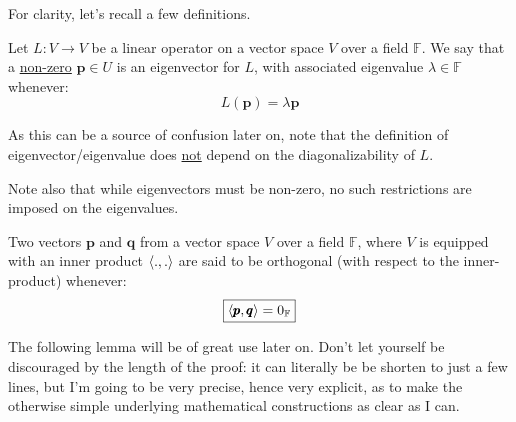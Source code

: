 \documentclass[solutions.tex]{subfiles}
\renewcommand{\bm}[1]{\pmb{#1}}
\begin{document}
For clarity, let's recall a few definitions.

\begin{definition} Let $L : V \rightarrow V$ be a linear operator
on a vector space $V$ over a field $\mathbb{F}$.
We say that a \underline{non-zero} $\bm{p}\in U$ is an eigenvector for $L$,
with associated eigenvalue $\lambda\in\mathbb{F}$ whenever:
\[
	L(\bm{p}) = \lambda\bm{p}
\]
\end{definition}

\begin{remark} As this can be a source of confusion later on, note
that the definition of eigenvector/eigenvalue does \underline{not}
depend on the diagonalizability of $L$.
\end{remark}

\begin{remark} Note also that while eigenvectors must be
non-zero, no such restrictions are imposed on the eigenvalues.
\end{remark}

\begin{definition} Two vectors $\bm{p}$ and $\bm{q}$ from
a vector space $V$ over a field $\mathbb{F}$, where $V$ is
equipped with an inner product $\left\langle . , . \right\rangle$ are said to
be orthogonal (with respect to the inner-product) whenever:
\[
	\boxed{\innerprod{\bm{p}}{\bm{q}} = 0_{\mathbb{F}}}
\]
\end{definition}

The following lemma will be of great use later on. Don't
let yourself be discouraged by the length of the proof: it can
literally be be shorten to just a few lines, but I'm going to
be very precise, hence very explicit, as to make the otherwise
simple underlying mathematical constructions as clear as I can.
\end{document}

